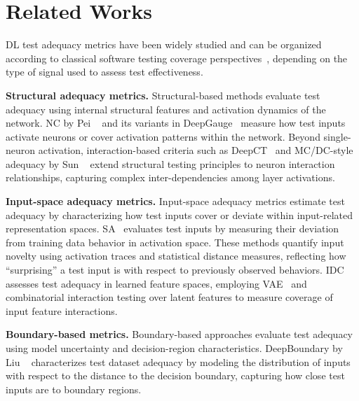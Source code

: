 \section{Related Works}

DL test adequacy metrics have been widely studied and can be organized according to classical software testing coverage perspectives~\cite{bib:ammann2008introduction}, depending on the type of signal used to assess test effectiveness. 

\textbf{Structural adequacy metrics.}
Structural-based methods evaluate test adequacy using internal structural features and activation dynamics of the network. NC by Pei \etal~\cite{bib:pei2017deepxplore} and its variants in DeepGauge~\cite{bib:ma2018deepgauge} measure how test inputs activate neurons or cover activation patterns within the network. Beyond single-neuron activation, interaction-based criteria such as DeepCT~\cite{bib:ma2019deepct} and MC/DC-style adequacy by Sun \etal~\cite{bib:sun2018testing} extend structural testing principles to neuron interaction relationships, capturing complex inter-dependencies among layer activations.

\textbf{Input-space adequacy metrics.}
Input-space adequacy metrics estimate test adequacy by characterizing how test inputs cover or deviate within input-related representation spaces.
SA~\cite{bib:kim2018guiding} evaluates test inputs by measuring their deviation from training data behavior in activation space.
These methods quantify input novelty using activation traces and statistical distance measures, reflecting how ``surprising'' a test input is with respect to previously observed behaviors.
IDC~\cite{bib:dola2023input} assesses test adequacy in learned feature spaces, employing VAE~\cite{bib:kingma2014autoencoding,bib:higgins2017betavae} and combinatorial interaction testing over latent features to measure coverage of input feature interactions.

\textbf{Boundary-based metrics.}
Boundary-based approaches evaluate test adequacy using model uncertainty and decision-region characteristics. DeepBoundary by Liu \etal~\cite{bib:liu2022deepboundary} characterizes test dataset adequacy by modeling the distribution of inputs with respect to the distance to the decision boundary, capturing how close test inputs are to boundary regions.

